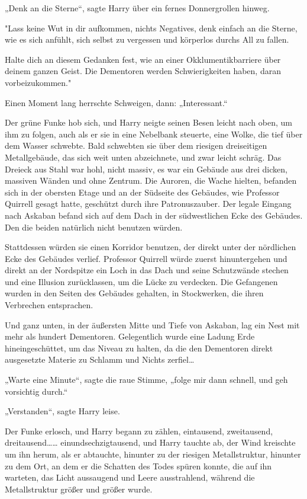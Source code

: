 {„Denk an die Sterne“, sagte Harry über ein fernes Donnergrollen hinweg.

"Lass keine Wut in dir aufkommen, nichts Negatives, denk einfach an die Sterne, wie es sich anfühlt, sich selbst zu vergessen und körperlos durchs All zu fallen.

Halte dich an diesem Gedanken fest, wie an einer Okklumentikbarriere über deinem ganzen Geist. Die Dementoren werden Schwierigkeiten haben, daran vorbeizukommen."

Einen Moment lang herrschte Schweigen, dann: „Interessant.“

Der grüne Funke hob sich, und Harry neigte seinen Besen leicht nach oben, um ihm zu folgen, auch als er sie in eine Nebelbank steuerte, eine Wolke, die tief über dem Wasser schwebte. Bald schwebten sie über dem riesigen dreiseitigen Metallgebäude, das sich weit unten abzeichnete, und zwar leicht schräg. Das Dreieck aus Stahl war hohl, nicht massiv, es war ein Gebäude aus drei dicken, massiven Wänden und ohne Zentrum. Die Auroren, die Wache hielten, befanden sich in der obersten Etage und an der Südseite des Gebäudes, wie Professor Quirrell gesagt hatte, geschützt durch ihre Patronuszauber. Der legale Eingang nach Askaban befand sich auf dem Dach in der südwestlichen Ecke des Gebäudes. Den die beiden natürlich nicht benutzen würden.

Stattdessen würden sie einen Korridor benutzen, der direkt unter der nördlichen Ecke des Gebäudes verlief. Professor Quirrell würde zuerst hinuntergehen und direkt an der Nordspitze ein Loch in das Dach und seine Schutzwände stechen und eine Illusion zurücklassen, um die Lücke zu verdecken. Die Gefangenen wurden in den Seiten des Gebäudes gehalten, in Stockwerken, die ihren Verbrechen entsprachen.

Und ganz unten, in der äußersten Mitte und Tiefe von Askaban, lag ein Nest mit mehr als hundert Dementoren. Gelegentlich wurde eine Ladung Erde hineingeschüttet, um das Niveau zu halten, da die den Dementoren direkt ausgesetzte Materie zu Schlamm und Nichts zerfiel…

„Warte eine Minute“, sagte die raue Stimme, „folge mir dann schnell, und geh vorsichtig durch.“

„Verstanden“, sagte Harry leise.

Der Funke erlosch, und Harry begann zu zählen, eintausend, zweitausend, dreitausend…… einundsechzigtausend, und Harry tauchte ab, der Wind kreischte um ihn herum, als er abtauchte, hinunter zu der riesigen Metallstruktur, hinunter zu dem Ort, an dem er die Schatten des Todes spüren konnte, die auf ihn warteten, das Licht aussaugend und Leere ausstrahlend, während die Metallstruktur größer und größer wurde.

}
